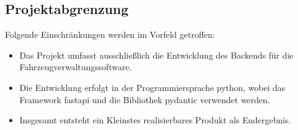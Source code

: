 \subsection{Projektabgrenzung}

Folgende Einschränkungen werden im Vorfeld getroffen:
\begin{itemize}
    \item Das Projekt umfasst ausschließlich die Entwicklung des Backends für die Fahrzeugverwaltungssoftware.
    \item Die Entwicklung erfolgt in der Programmiersprache \gls{python}, wobei das Framework \gls{fastapi} und die Bibliothek \gls{pydantic} verwendet werden.
    \item Insgesamt entsteht ein Kleinstes realisierbares Produkt als Endergebnis.
\end{itemize}